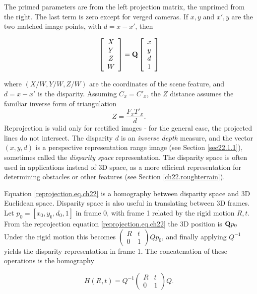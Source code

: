 \documentclass[twocolumn,oneside]{book}
\def\vec#1{\begin{array}{c}#1\end{array}}
\begin{document}
\noindent The primed parameters are from the left projection matrix, the
unprimed from the right.  The last term is zero except for verged
cameras.  If $x,y$ and $x',y$ are the two matched image points, with
$d=x-x'$, then 

\begin{eqnarray}
\left[
\vec{X\\ Y\\ Z\\ W}
\right] 
=
 \bf{Q} \left[ \vec{x\\ y\\ d \\ 1} \right]
\label{reprojection.eq.ch22}
\end{eqnarray}
 
\noindent where $(X/W, Y/W, Z/W)$ are the coordinates of the scene
feature, and $d = x - x'$ is the disparity.  Assuming $C_x = C'_x$,
the $Z$ distance assumes the familiar inverse form of triangulation
\begin{equation}
 Z = \frac{F_x T'_x}{d}.
\label{eq22.disparity-range}
\end{equation}
\noindent Reprojection is valid only for rectified images - for the general
case, the projected lines do not intersect.
The disparity $d$ is an {\em inverse depth}
measure, and the vector $(x,y,d)$ is a perspective representation
range image (see Section \ref{sec22.1.1}), sometimes called the {\em
disparity space} representation.  The disparity space is often used in
applications instead of 3D space, as a more efficient representation
for determining obstacles or other features (see Section
\ref{ch22.roughterrain}).

Equation \ref{reprojection.eq.ch22} is a homography between disparity
space and 3D Euclidean space.  Disparity space is also useful in
translating between 3D frames.  Let $p_0 = [x_0,y_0,d_0,1]$ in frame
0, with frame 1 related by the rigid motion $R,t$.  From the
reprojection equation
\ref{reprojection.eq.ch22} the 3D position is ${\bf Q}p_0$ Under the
rigid motion this becomes $\left(\begin{array}{cc}R&t\\ 0 & 1
\end{array}\right)Qp_0$, and finally applying $Q^{-1}$ yields the
disparity representation in frame 1.  The concatenation of these
operations is the homography 

\begin{equation}
H(R,t) = Q^{-1}\left(\begin{array}{cc}R&t
  \\ 0 & 1 \end{array}\right)Q.  
\label{homography.eq.ch22}
\end{equation}
\end{document}
